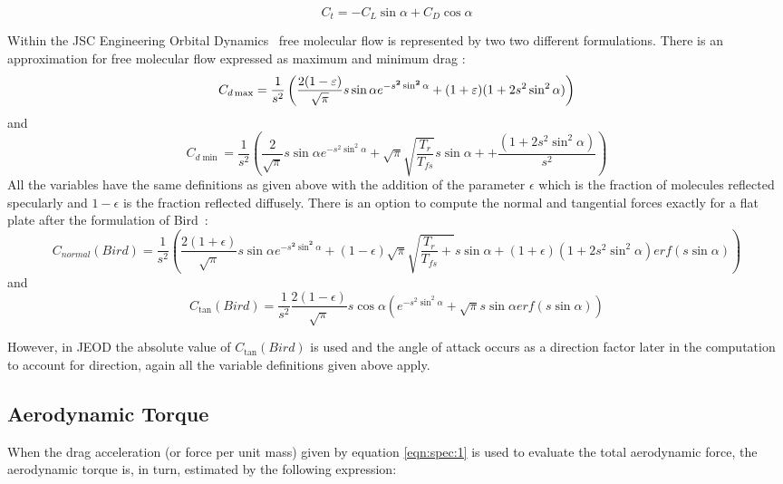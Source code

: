 \begin{equation}
  C_t  =  - C_L \sin \alpha  + C_D \cos \alpha
\end{equation}


Within the JSC Engineering Orbital Dynamics \aerodynamicsDesc\ free molecular flow
is represented by two two different formulations.  There is an
approximation for free molecular flow expressed as maximum and
minimum drag :
\begin{equation}
C_{d\max }  = \frac{1}{{s^2 }}\left( {\frac{{2(1 - \varepsilon )}}{{\sqrt \pi  }}s\sin \alpha e^{ - s^{\bf{2}} \sin ^{\bf{2}} \alpha }  + (1 + \varepsilon )(1 + 2s^2 \sin ^2 \alpha )} \right)\label{eqn:spec:2}
\end{equation}
and
\begin{equation}
C_{d\min }  = \frac{1}{{s^2 }}\left( {\frac{2}{{\sqrt \pi  }}s\sin \alpha e^{ - s^2 \sin ^2 \alpha }  + \sqrt \pi  \sqrt {\frac{{T_r }}{{T_{fs} }}} s\sin \alpha  +  + \frac{{(1 + 2s^2 \sin ^2 \alpha )}}{{s^2 }}} \right)\label{eqn:spec:3}
\end{equation}
All the variables have the same definitions as given above with the addition
of the parameter $\epsilon$ which is the fraction of molecules reflected
specularly and $1-\epsilon$ is the fraction reflected diffusely.  There is an
option to compute the normal and tangential forces exactly for a flat plate
after the formulation of Bird~\cite{Bird}:
\begin{equation}
C_{normal} (Bird) = \frac{1}
{{s^2 }}\left( {\frac{{2(1 + \epsilon )}}
{{\sqrt \pi  }}s\sin \alpha e^{ - s^{\mathbf{2}} \sin ^{\mathbf{2}} \alpha }  + (1 - \epsilon )\sqrt \pi  \sqrt {\frac{{T_r }}
{{T_{fs} }} + } s\sin \alpha  + (1 + \epsilon )(1 + 2s^2 \sin ^2 \alpha )erf(s\sin \alpha )} \right)\label{eqn:spec:4}
\end{equation}
and
\begin{equation}
C_{\tan } (Bird) = \frac{1}
{{s^2 }}\frac{{2(1 - \epsilon )}}
{{\sqrt \pi  }}s\cos \alpha \left( {e^{ - s^2 \sin ^2 \alpha }  + \sqrt \pi  s\sin \alpha erf(s\sin \alpha )} \right)\label{eqn:spec:5}
\end{equation}

However, in JEOD the absolute value of $C_{\tan } (Bird)$ is used and the angle
of attack occurs as a direction factor later in the computation to account
for direction, again all the variable definitions given above apply.

\subsection{Aerodynamic Torque}
When the drag acceleration (or force per unit mass) given by equation \ref{eqn:spec:1} is used to evaluate the total
aerodynamic force, the aerodynamic torque is, in turn, estimated by the
following expression:

